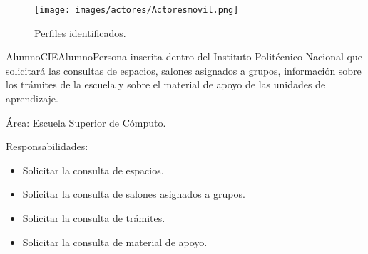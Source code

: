     \begin{figure}[h!]
	\begin{center}
		\texttt{[image: images/actores/Actoresmovil.png]}
		\caption{Perfiles identificados.}
		\label{fig:perfilesMovil}
	\end{center}
\end{figure}
    \begin{actor}{Alumno}{CIEAlumno}{Persona inscrita dentro del Instituto Politécnico Nacional que solicitará las consultas de espacios, salones asignados a grupos, información sobre los trámites de la escuela y sobre el material de apoyo de las unidades de aprendizaje.}

	\item[Área:] Escuela Superior de Cómputo.

	\item[Responsabilidades:] \hspace{1pt}
	
		\begin{itemize}

		    \item Solicitar la consulta de espacios.
		    \item Solicitar la consulta de salones asignados a grupos.
		    \item Solicitar la consulta de trámites.
		    \item Solicitar la consulta de material de apoyo.


\end{itemize}
\end{actor}

